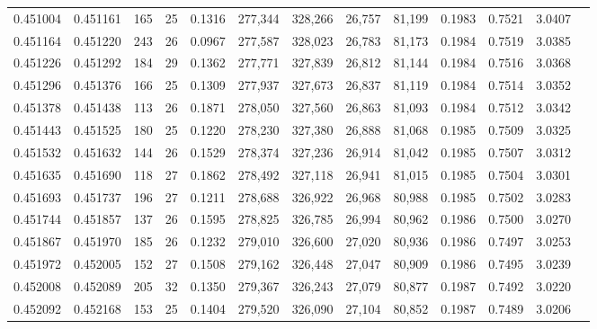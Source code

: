 \begin{tabular}{rrrrrrrrrrrrr}
0.451004 & 0.451161 & 165 &  25 &                                     0.1316 & 277,344 & 328,266 &  26,757 &  81,199 & 0.1983 & 0.7521 & 3.0407 \\
0.451164 & 0.451220 & 243 &  26 &                                     0.0967 & 277,587 & 328,023 &  26,783 &  81,173 & 0.1984 & 0.7519 & 3.0385 \\
0.451226 & 0.451292 & 184 &  29 &                                     0.1362 & 277,771 & 327,839 &  26,812 &  81,144 & 0.1984 & 0.7516 & 3.0368 \\
0.451296 & 0.451376 & 166 &  25 &                                     0.1309 & 277,937 & 327,673 &  26,837 &  81,119 & 0.1984 & 0.7514 & 3.0352 \\
0.451378 & 0.451438 & 113 &  26 &                                     0.1871 & 278,050 & 327,560 &  26,863 &  81,093 & 0.1984 & 0.7512 & 3.0342 \\
0.451443 & 0.451525 & 180 &  25 &                                     0.1220 & 278,230 & 327,380 &  26,888 &  81,068 & 0.1985 & 0.7509 & 3.0325 \\
0.451532 & 0.451632 & 144 &  26 &                                     0.1529 & 278,374 & 327,236 &  26,914 &  81,042 & 0.1985 & 0.7507 & 3.0312 \\
0.451635 & 0.451690 & 118 &  27 &                                     0.1862 & 278,492 & 327,118 &  26,941 &  81,015 & 0.1985 & 0.7504 & 3.0301 \\
0.451693 & 0.451737 & 196 &  27 &                                     0.1211 & 278,688 & 326,922 &  26,968 &  80,988 & 0.1985 & 0.7502 & 3.0283 \\
0.451744 & 0.451857 & 137 &  26 &                                     0.1595 & 278,825 & 326,785 &  26,994 &  80,962 & 0.1986 & 0.7500 & 3.0270 \\
0.451867 & 0.451970 & 185 &  26 &                                     0.1232 & 279,010 & 326,600 &  27,020 &  80,936 & 0.1986 & 0.7497 & 3.0253 \\
0.451972 & 0.452005 & 152 &  27 &                                     0.1508 & 279,162 & 326,448 &  27,047 &  80,909 & 0.1986 & 0.7495 & 3.0239 \\
0.452008 & 0.452089 & 205 &  32 &                                     0.1350 & 279,367 & 326,243 &  27,079 &  80,877 & 0.1987 & 0.7492 & 3.0220 \\
0.452092 & 0.452168 & 153 &  25 &                                     0.1404 & 279,520 & 326,090 &  27,104 &  80,852 & 0.1987 & 0.7489 & 3.0206 \\

\end{tabular}
